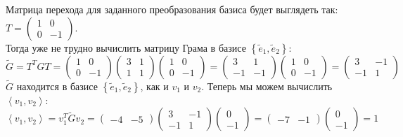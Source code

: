 \documentclass{article}
\begin{document}
\begin{center}
    Матрица перехода для заданного преобразования базиса будет выглядеть так: $
        T=\begin{pmatrix}
            1 & 0 \\ 0 & -1
        \end{pmatrix}
    $.\\
    Тогда уже не трудно вычислить матрицу Грама в базисе $\left\{\tilde{e}_1, \tilde{e}_2\right\}$:
    $$
        \tilde{G} = T^{T}GT = \begin{pmatrix}
            1 & 0 \\ 0 & -1
        \end{pmatrix}\begin{pmatrix}
            3 & 1 \\ 1 & 1
        \end{pmatrix}\begin{pmatrix}
            1 & 0 \\ 0 & -1
        \end{pmatrix} = \begin{pmatrix}
            3 & 1 \\ -1 & -1
        \end{pmatrix}\begin{pmatrix}
            1 & 0 \\ 0 & -1
        \end{pmatrix} = \begin{pmatrix}
            3 & -1 \\ -1 & 1
        \end{pmatrix}
    $$
    $\tilde{G}$ находится в базисе $\left\{\tilde{e}_1, \tilde{e}_2\right\}$, как и $v_1$ и $v_2$. Теперь мы можем вычислить $\left\langle v_1, v_2\right\rangle $:
    $$\left\langle v_1, v_2\right\rangle = v_1^T\tilde{G}v_2 = \begin{pmatrix}
        -4 & -5
    \end{pmatrix}\begin{pmatrix}
        3 & -1 \\ -1 & 1
    \end{pmatrix}\begin{pmatrix}
        0 \\ -1
    \end{pmatrix} = \begin{pmatrix}
        -7 & -1
    \end{pmatrix}\begin{pmatrix}
        0 \\ -1
    \end{pmatrix} = 1$$
\end{center}
\end{document}
